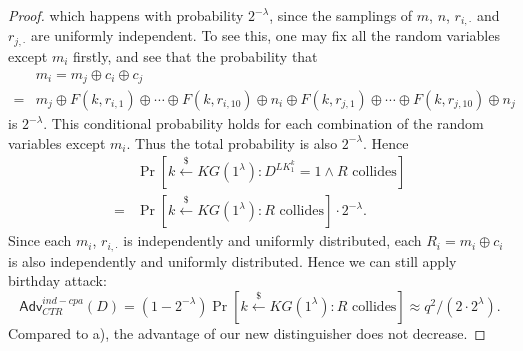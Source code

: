 \documentclass[12pt]{article}
\newcommand{\getsr}{\stackrel{\$}{\gets}}
\newcommand{\Adv}{\textsf{Adv}}
\theoremstyle{definition}
\begin{document}
\begin{proof}
which happens with probability $2^{-\lambda}$, since the samplings of $m$, $n$, $r_{i,\cdot}$ and $r_{j,\cdot}$ are uniformly independent. To see this, one may fix all the random variables except $m_i$ firstly, and see that the probability that
$$\begin{aligned}
& m_i = m_j \oplus c_i \oplus c_j \\
=& m_j \oplus F(k, r_{i,1}) \oplus \cdots \oplus F(k, r_{i,10}) \oplus n_i \oplus F(k, r_{j,1}) \oplus \cdots \oplus F(k, r_{j,10}) \oplus n_j
\end{aligned}$$
is $2^{-\lambda}$. This conditional probability holds for each combination of the random variables except $m_i$. Thus the total probability is also $2^{-\lambda}$. 
Hence
$$\begin{aligned}
& \Pr[k \getsr KG(1^\lambda) : D^{LK_1^k}=1 \wedge \textrm{$R$ collides}] \\
=& \Pr[k \getsr KG(1^\lambda): \textrm{$R$ collides}]\cdot 2^{-\lambda}. 
\end{aligned}$$
Since each $m_i$, $r_{i,\cdot}$ is independently and uniformly distributed, each $R_i = m_i \oplus c_i$ is also independently and uniformly distributed. Hence we can still apply birthday attack:
$$\Adv_{CTR}^{ind-cpa}(D) = (1-2^{-\lambda}) \Pr[k \getsr KG(1^\lambda): \textrm{$R$ collides}] \approx q^2/(2\cdot 2^\lambda).$$
Compared to a), the advantage of our new distinguisher does not decrease.
\end{proof}
\end{document}
